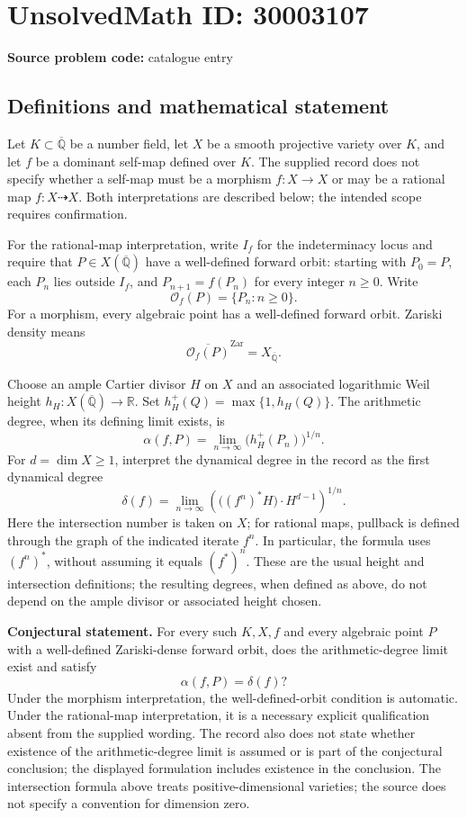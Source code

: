 \documentclass[11pt]{article}
\newcommand{\Q}{\mathbb{Q}}
\newcommand{\R}{\mathbb{R}}
\begin{document}
\section*{UnsolvedMath ID: 30003107}
\textbf{Source problem code:} catalogue entry
\subsection{Definitions and mathematical statement}
Let \(K\subset\overline{\Q}\) be a number field, let \(X\) be a smooth projective variety over \(K\), and let \(f\) be a dominant self-map defined over \(K\). The supplied record does not specify whether a self-map must be a morphism \(f\colon X\to X\) or may be a rational map \(f\colon X\dashrightarrow X\). Both interpretations are described below; the intended scope requires confirmation.

For the rational-map interpretation, write \(I_f\) for the indeterminacy locus and require that \(P\in X(\overline{\Q})\) have a well-defined forward orbit: starting with \(P_0=P\), each \(P_n\) lies outside \(I_f\), and \(P_{n+1}=f(P_n)\) for every integer \(n\geq 0\). Write
\[
\mathcal O_f(P)=\{P_n:n\geq 0\}.
\]
For a morphism, every algebraic point has a well-defined forward orbit. Zariski density means
\[
\overline{\mathcal O_f(P)}^{\mathrm{Zar}}=X_{\overline{\Q}}.
\]

Choose an ample Cartier divisor \(H\) on \(X\) and an associated logarithmic Weil height \(h_H\colon X(\overline{\Q})\to\R\). Set \(h_H^+(Q)=\max\{1,h_H(Q)\}\). The arithmetic degree, when its defining limit exists, is
\[
\alpha(f,P)=\lim_{n\to\infty}\bigl(h_H^+(P_n)\bigr)^{1/n}.
\]
For \(d=\dim X\geq 1\), interpret the dynamical degree in the record as the first dynamical degree
\[
\delta(f)=\lim_{n\to\infty}\left(\bigl((f^n)^*H\bigr)\cdot H^{d-1}\right)^{1/n}.
\]
Here the intersection number is taken on \(X\); for rational maps, pullback is defined through the graph of the indicated iterate \(f^n\). In particular, the formula uses \((f^n)^*\), without assuming it equals \((f^*)^n\). These are the usual height and intersection definitions; the resulting degrees, when defined as above, do not depend on the ample divisor or associated height chosen.

\textbf{Conjectural statement.} For every such \(K,X,f\) and every algebraic point \(P\) with a well-defined Zariski-dense forward orbit, does the arithmetic-degree limit exist and satisfy
\[
\alpha(f,P)=\delta(f)?
\]
Under the morphism interpretation, the well-defined-orbit condition is automatic. Under the rational-map interpretation, it is a necessary explicit qualification absent from the supplied wording. The record also does not state whether existence of the arithmetic-degree limit is assumed or is part of the conjectural conclusion; the displayed formulation includes existence in the conclusion. The intersection formula above treats positive-dimensional varieties; the source does not specify a convention for dimension zero.
\end{document}
